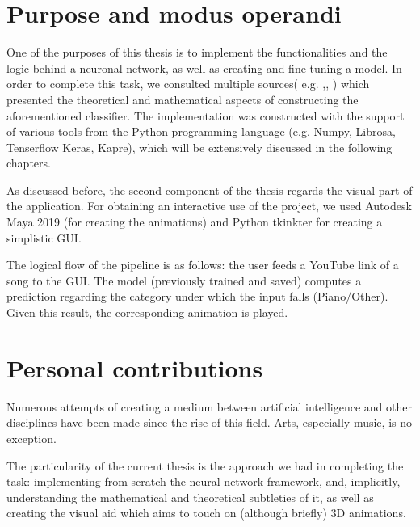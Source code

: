 	\section{Purpose and modus operandi}

	One of the purposes of this thesis is to implement the functionalities and the logic behind a neuronal network, as well as creating and fine-tuning a model. In order to complete this task, we consulted multiple sources( e.g. \cite{nnfs},\cite{DLFMIR},\cite{BACDNN} ) which presented the theoretical and mathematical aspects of constructing the aforementioned classifier. The implementation was constructed with the support of various tools from the Python programming language (e.g. Numpy, Librosa, Tenserflow Keras, Kapre), which will be extensively discussed in the following chapters.

	As discussed before, the second component of the thesis regards the visual part of the application. For obtaining an interactive use of the project, we used Autodesk Maya 2019 (for creating the animations) and Python tkinkter for creating a simplistic GUI.

	The logical flow of the pipeline is as follows: the user feeds a YouTube link of a song to the GUI. The model (previously trained and saved) computes a prediction regarding the category under which the input falls (Piano/Other). Given this result, the corresponding animation is played.

	\section{Personal contributions}


	Numerous attempts of creating a medium between artificial intelligence and other disciplines have been made since the rise of this field. Arts, especially music, is no exception.

	The particularity of the current thesis is the approach we had in completing the task: implementing from scratch the neural network framework, and, implicitly, understanding the mathematical and theoretical subtleties of it, as well as creating the visual aid which aims to touch on (although briefly) 3D animations.

